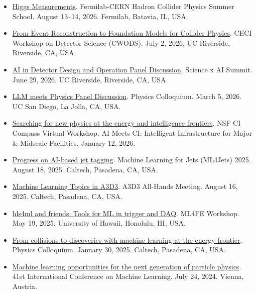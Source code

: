 \documentclass[11pt]{res}
\begin{document}
\begin{resume}
  \begin{itemize}
    \itemsep-0.3em
    \item \href{https://indico.fnal.gov/event/71907/timetable/#35-higgs-measurements}{Higgs Measurements}. Fermilab-CERN Hadron Collider Physics Summer School. August 13--14, 2026. Fermilab, Batavia, IL, USA.
    \item \href{https://ceci.ucr.edu/cwods2026}{From Event Reconstruction to Foundation Models for Collider Physics}. CECI Workshop on Detector Science (CWODS). July 2, 2026. UC Riverside, Riverside, CA, USA.
    \item \href{https://sair.foundation/events/science-ai-summit-2026-uc-riverside}{AI in Detector Design and Operation Panel Discussion}. Science x AI Summit. June 29, 2026. UC Riverside, Riverside, CA, USA.
    \item \href{https://physics.ucsd.edu/events/seminars-colloquia/event?event_id=2493}{LLM meets Physics Panel Discussion}. Physics Colloquium. March 5, 2026. UC San Diego, La Jolla, CA, USA.
    \item \href{https://ci-compass.org/news-and-events/events/virtual-workshop-ai-meets-ci-intelligent-infrastructure-for-major-and-midscale-facilities/}{Searching for new physics at the energy and intelligence frontiers}. NSF CI Compass Virtual Workshop. AI Meets CI: Intelligent Infrastructure for Major \& Midscale Facilities. January 12, 2026.
    \item \href{https://indico.cern.ch/event/1526677/contributions/6591856/}{Progress on AI-based jet tagging}. Machine Learning for Jets (ML4Jets) 2025. August 18, 2025. Caltech, Pasadena, CA, USA.
    \item \href{https://indico.cern.ch/event/1555253/contributions/6651428/}{Machine Learning Topics in A3D3}. A3D3 All-Hands Meeting. August 16, 2025. Caltech, Pasadena, CA, USA.
    \item \href{https://indico.phys.hawaii.edu/event/2506/contributions/7774/}{hls4ml and friends: Tools for ML in trigger and DAQ}. ML4FE Workshop. May 19, 2025. University of Hawaii, Honolulu, HI, USA.
    \item \href{https://www.caltech.edu/campus-life-events/calendar/physics-colloquium-85}{From collisions to discoveries with machine learning at the energy frontier}. Physics Colloquium. January 30, 2025. Caltech, Pasadena, CA, USA.
    \item \href{https://icml.cc/virtual/2024/invited-talk/35254}{Machine learning opportunities for the next generation of particle physics}. 41st International Conference on Machine Learning. July 24, 2024. Vienna, Austria.

\end{itemize}
\end{resume}
\end{document}
